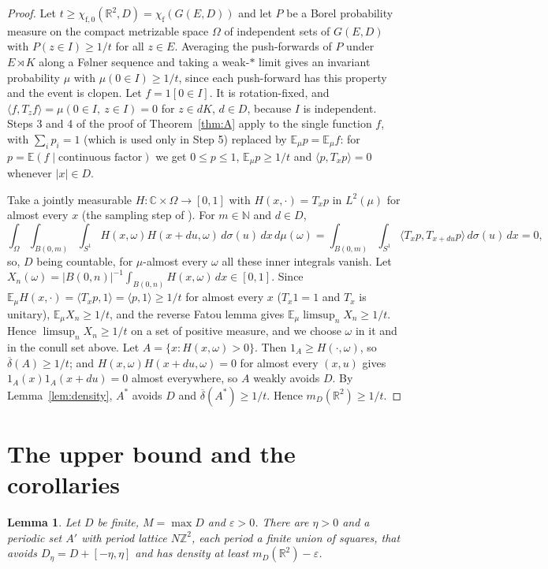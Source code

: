 \documentclass[11pt,a4paper]{amsart}
\newtheorem{lemma}[theorem]{Lemma}
\theoremstyle{definition}
\theoremstyle{remark}
\newcommand{\C}{\mathbb{C}}
\newcommand{\R}{\mathbb{R}}
\newcommand{\Z}{\mathbb{Z}}
\newcommand{\N}{\mathbb{N}}
\newcommand{\E}{\mathbb{E}}
\newcommand{\dens}{\overline{\delta}}
\newcommand{\chif}{\chi_{\mathrm f}}
\begin{document}
\begin{proof}
Let $t\ge\chi_{\mathrm f,0}(\R^2,D)=\chif(G(E,D))$ and let $P$ be a Borel probability measure on the compact
metrizable space $\Omega$ of independent sets of $G(E,D)$ with $P(z\in I)\ge1/t$ for all $z\in E$. Averaging the
push-forwards of $P$ under $E\rtimes K$ along a F\o lner sequence and taking a weak-$*$ limit gives an invariant
probability $\mu$ with $\mu(0\in I)\ge1/t$, since each push-forward has this property and the event is clopen. Let
$f=1[0\in I]$. It is rotation-fixed, and $\langle f,T_zf\rangle=\mu(0\in I,\ z\in I)=0$ for $z\in dK$, $d\in D$,
because $I$ is independent. Steps 3 and 4 of the proof of Theorem~\ref{thm:A} apply to the single function $f$, with
$\sum_ip_i=1$ (which is used only in Step 5) replaced by $\E_\mu p=\E_\mu f$: for $p=\E(f\mid\text{continuous
factor})$ we get $0\le p\le1$, $\E_\mu p\ge1/t$ and $\langle p,T_xp\rangle=0$ whenever $|x|\in D$.

Take a jointly measurable $H:\C\times\Omega\to[0,1]$ with $H(x,\cdot)=T_xp$ in $L^2(\mu)$ for almost every $x$ (the
sampling step of \cite[Prop.~4.2]{OpenAI}). For $m\in\N$ and $d\in D$,
\[
\int_\Omega\int_{B(0,m)}\int_{S^1}H(x,\omega)H(x+du,\omega)\,d\sigma(u)\,dx\,d\mu(\omega)
=\int_{B(0,m)}\int_{S^1}\langle T_xp,T_{x+du}p\rangle\,d\sigma(u)\,dx=0,
\]
so, $D$ being countable, for $\mu$-almost every $\omega$ all these inner integrals vanish. Let
$X_n(\omega)=|B(0,n)|^{-1}\int_{B(0,n)}H(x,\omega)\,dx\in[0,1]$. Since $\E_\mu H(x,\cdot)=\langle
T_xp,1\rangle=\langle p,1\rangle\ge1/t$ for almost every $x$ ($T_x1=1$ and $T_x$ is unitary), $\E_\mu X_n\ge1/t$,
and the reverse Fatou lemma gives $\E_\mu\limsup_nX_n\ge1/t$. Hence $\limsup_nX_n\ge1/t$ on a set of positive
measure, and we choose $\omega$ in it and in the conull set above. Let $A=\{x:H(x,\omega)>0\}$. Then
$1_A\ge H(\cdot,\omega)$, so $\dens(A)\ge1/t$; and $H(x,\omega)H(x+du,\omega)=0$ for almost every $(x,u)$ gives
$1_A(x)1_A(x+du)=0$ almost everywhere, so $A$ weakly avoids $D$. By Lemma~\ref{lem:density}, $A^*$ avoids $D$ and
$\dens(A^*)\ge1/t$. Hence $m_D(\R^2)\ge1/t$.
\end{proof}

\section{The upper bound and the corollaries}\label{sec:upper}

\begin{lemma}\label{lem:periodic}
Let $D$ be finite, $M=\max D$ and $\varepsilon>0$. There are $\eta>0$ and a periodic set $A'$ with period lattice
$N\Z^2$, each period a finite union of squares, that avoids $D_\eta=D+[-\eta,\eta]$ and has density at least
$m_D(\R^2)-\varepsilon$.
\end{lemma}
\end{document}
